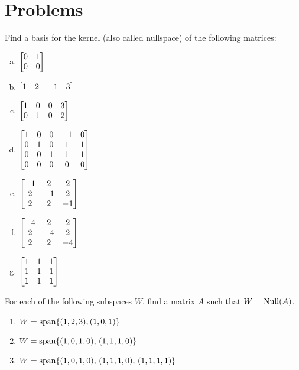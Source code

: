 \section*{Problems}

\begin{prob} \label{prob15.1} Find a basis for the kernel (also called nullspace) of the following matrices:

\begin{enumerate}[a)]
\item $\bmatrix  0 & 1  \\
 0 & 0 \endbmatrix$
\medskip
%
\item\sov $\bmatrix  1 & 2 & -1 & 3 \endbmatrix$ 
\medskip
%
\item $\bmatrix  1 & 0 & 0 & 3  \\
 0 & 1 & 0 & 2   \\
 \endbmatrix$
\medskip
%
\item\sov $ \bmatrix 
1& 0& 0& -1& 0\\  
0& 1& 0& 1&1\\ 
0& 0& 1& 1& 1\\ 
0& 0& 0& 0& 0\endbmatrix$
\medskip
%
\item $\bmatrix
-1&2&2\\ 2&-1&2\\ 2&2&-1 \endbmatrix$
\medskip
%
\item\sov  $\bmatrix
-4&2&2\\ 2&-4&2\\ 2&2&-4 \endbmatrix$
\medskip
%
\item  $\bmatrix
1&1&1\\ 1&1&1\\1&1&1 \endbmatrix$
\medskip
%
\end{enumerate}
\end{prob}

\begin{prob} \label{prob15.2} For each of the following subspaces $W$, find a matrix $A$ such that $W=\operatorname{Null}(A)$.

\begin{enumerate}
\item $W=\textrm{span}\{(1,2,3), (1,0,1)\}$
\medskip
%
\item $W=\textrm{span}\{(1,0,1,0),\, (1,1,1,0)\}$
\medskip
%
\item $W=\textrm{span}\{(1,0,1,0),\, (1,1,1,0),\, (1,1,1,1)\}$
\end{enumerate}
\end{prob}